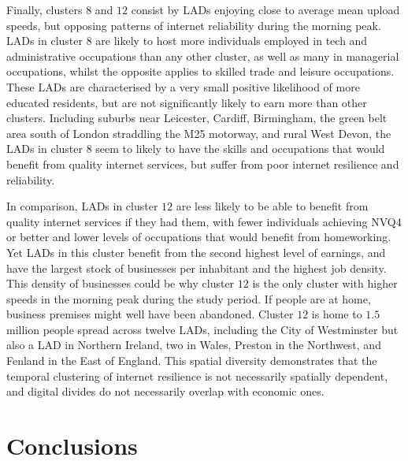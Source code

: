 \documentclass[Royal,times,sageh]{sagej}
\begin{document}
Finally, clusters \(8\) and \(12\) consist by LADs enjoying close to
average mean upload speeds, but opposing patterns of internet
reliability during the morning peak. LADs in cluster \(8\) are likely to
host more individuals employed in tech and administrative occupations
than any other cluster, as well as many in managerial occupations,
whilst the opposite applies to skilled trade and leisure occupations.
These LADs are characterised by a very small positive likelihood of more
educated residents, but are not significantly likely to earn more than
other clusters. Including suburbs near Leicester, Cardiff, Birmingham,
the green belt area south of London straddling the M25 motorway, and
rural West Devon, the LADs in cluster \(8\) seem to likely to have the
skills and occupations that would benefit from quality internet
services, but suffer from poor internet resilience and reliability.

In comparison, LADs in cluster \(12\) are less likely to be able to
benefit from quality internet services if they had them, with fewer
individuals achieving NVQ4 or better and lower levels of occupations
that would benefit from homeworking. Yet LADs in this cluster benefit
from the second highest level of earnings, and have the largest stock of
businesses per inhabitant and the highest job density. This density of
businesses could be why cluster \(12\) is the only cluster with higher
speeds in the morning peak during the study period. If people are at
home, business premises might well have been abandoned. Cluster \(12\)
is home to \(1.5\) million people spread across twelve LADs, including
the City of Westminster but also a LAD in Northern Ireland, two in
Wales, Preston in the Northwest, and Fenland in the East of England.
This spatial diversity demonstrates that the temporal clustering of
internet resilience is not necessarily spatially dependent, and digital
divides do not necessarily overlap with economic ones.

\hypertarget{sec:5}{%
\section{Conclusions}\label{sec:5}}
\end{document}
